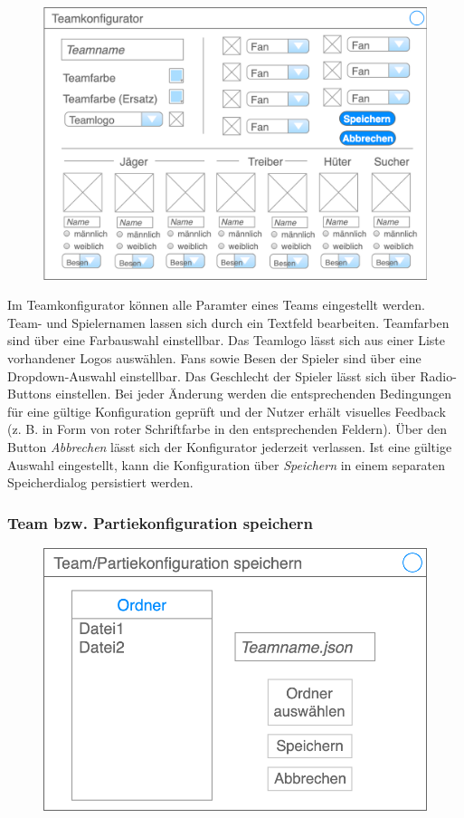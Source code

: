     \begin{figure}[H]
        \centering
        \includegraphics[width=\textwidth]{images/teamkonfigurator}
    \end{figure}

    Im Teamkonfigurator können alle Paramter eines Teams eingestellt werden. Team- und Spielernamen lassen sich durch ein Textfeld bearbeiten. Teamfarben sind über eine Farbauswahl einstellbar. Das Teamlogo lässt sich aus einer Liste vorhandener Logos auswählen. Fans sowie Besen der Spieler sind über eine Dropdown-Auswahl einstellbar. Das Geschlecht der Spieler lässt sich über Radio-Buttons einstellen. Bei jeder Änderung werden die entsprechenden Bedingungen für eine gültige Konfiguration geprüft und der Nutzer erhält visuelles Feedback (z. B. in Form von roter Schriftfarbe in den entsprechenden Feldern). Über den Button \textit{Abbrechen} lässt sich der Konfigurator jederzeit verlassen. Ist eine gültige Auswahl eingestellt, kann die Konfiguration über \textit{Speichern} in einem separaten Speicherdialog persistiert werden.

    \subsubsection{Team bzw. Partiekonfiguration speichern}

    \begin{figure}[H]
        \centering
        \includegraphics[width=\textwidth/2]{images/speichern}
    \end{figure}

